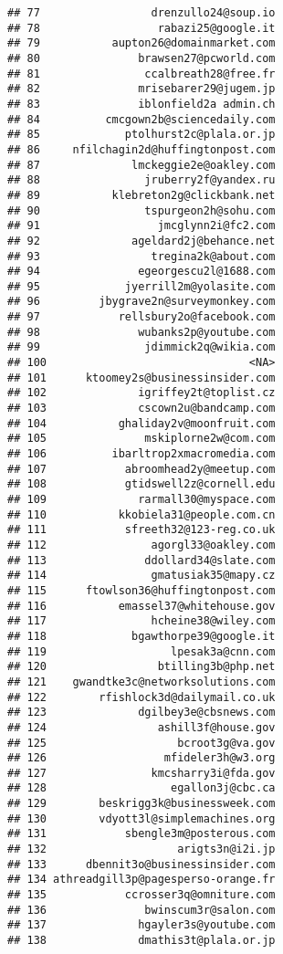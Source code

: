 \documentclass[]{article}
\begin{document}
\begin{verbatim}
## 77                 drenzullo24@soup.io
## 78                  rabazi25@google.it
## 79           aupton26@domainmarket.com
## 80               brawsen27@pcworld.com
## 81                ccalbreath28@free.fr
## 82               mrisebarer29@jugem.jp
## 83               iblonfield2a admin.ch
## 84          cmcgown2b@sciencedaily.com
## 85             ptolhurst2c@plala.or.jp
## 86     nfilchagin2d@huffingtonpost.com
## 87              lmckeggie2e@oakley.com
## 88                jruberry2f@yandex.ru
## 89           klebreton2g@clickbank.net
## 90                tspurgeon2h@sohu.com
## 91                  jmcglynn2i@fc2.com
## 92              ageldard2j@behance.net
## 93                 tregina2k@about.com
## 94               egeorgescu2l@1688.com
## 95             jyerrill2m@yolasite.com
## 96         jbygrave2n@surveymonkey.com
## 97            rellsbury2o@facebook.com
## 98               wubanks2p@youtube.com
## 99                jdimmick2q@wikia.com
## 100                               <NA>
## 101      ktoomey2s@businessinsider.com
## 102              igriffey2t@toplist.cz
## 103              cscown2u@bandcamp.com
## 104           ghaliday2v@moonfruit.com
## 105               mskiplorne2w@com.com
## 106          ibarltrop2xmacromedia.com
## 107            abroomhead2y@meetup.com
## 108            gtidswell2z@cornell.edu
## 109              rarmall30@myspace.com
## 110           kkobiela31@people.com.cn
## 111            sfreeth32@123-reg.co.uk
## 112                agorgl33@oakley.com
## 113               ddollard34@slate.com
## 114                gmatusiak35@mapy.cz
## 115      ftowlson36@huffingtonpost.com
## 116           emassel37@whitehouse.gov
## 117                hcheine38@wiley.com
## 118             bgawthorpe39@google.it
## 119                   lpesak3a@cnn.com
## 120                 btilling3b@php.net
## 121    gwandtke3c@networksolutions.com
## 122        rfishlock3d@dailymail.co.uk
## 123              dgilbey3e@cbsnews.com
## 124                 ashill3f@house.gov
## 125                    bcroot3g@va.gov
## 126                  mfideler3h@w3.org
## 127                kmcsharry3i@fda.gov
## 128                   egallon3j@cbc.ca
## 129        beskrigg3k@businessweek.com
## 130        vdyott3l@simplemachines.org
## 131            sbengle3m@posterous.com
## 132                    arigts3n@i2i.jp
## 133      dbennit3o@businessinsider.com
## 134 athreadgill3p@pagesperso-orange.fr
## 135            ccrosser3q@omniture.com
## 136               bwinscum3r@salon.com
## 137              hgayler3s@youtube.com
## 138              dmathis3t@plala.or.jp

\end{verbatim}
\end{document}
